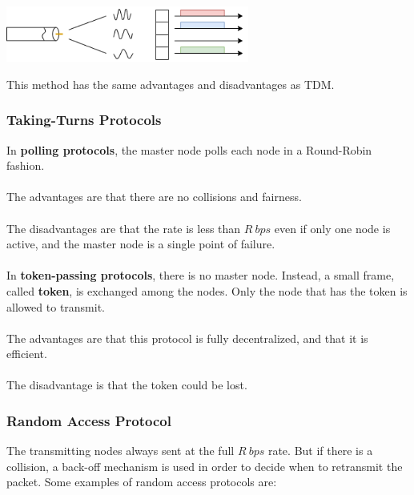 \documentclass{article}
\begin{document}
\centerline{\includegraphics[width=8cm]{./assets/fdm.png}}
\vspace{.9cm}
\noindent This method has the same advantages and disadvantages as TDM.

\subsubsection{Taking-Turns Protocols}
In \textbf{polling protocols}, the master node polls each node in a Round-Robin fashion. \\ \\
The advantages are that there are no collisions and fairness. \\ \\
The disadvantages are that the rate is less than $R~bps$ even if only one node is active, and the master node is a single point of failure. \\ \\
In \textbf{token-passing protocols}, there is no master node. Instead, a small frame, called \textbf{token}, is exchanged among the nodes. Only the node that has the token is allowed to transmit. \\ \\
The advantages are that this protocol is fully decentralized, and that it is efficient. \\ \\
The disadvantage is that the token could be lost.

\subsubsection{Random Access Protocol}
The transmitting nodes always sent at the full $R~bps$ rate. But if there is a collision, a back-off mechanism is used in order to decide when to retransmit the packet. Some examples of random access protocols are:
\end{document}
